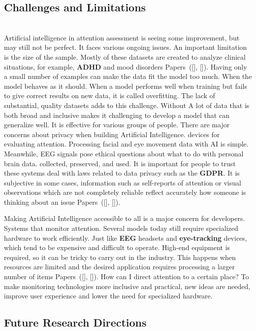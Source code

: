 \documentclass[twocolumn,12pt]{article}
\begin{document}
{\subsection{ Challenges and Limitations} \\ 

Artificial intelligence in attention assessment is seeing some improvement, but may still not be perfect. It faces various ongoing issues. An important limitation is the size of the sample. Mostly of these datasets are created to analyze clinical situations, for example, \textbf{ADHD} and mood disorders Papers~([\citealp{ref11}], [\citealp{ref13}]). Having only a small number of examples can make the data fit the model too much. When the model behaves as it should. When a model performs well when training but fails to give correct results on new data, it is called overfitting. The lack of substantial, quality datasets adds to this challenge. Without
A lot of data that is both broad and inclusive makes it challenging to develop a model that can generalize well. It is effective for various groups of people. There are major concerns about privacy when building Artificial Intelligence.
devices for evaluating attention. Processing facial and eye movement data with AI is simple. Meanwhile, EEG signals pose ethical questions about what to do with personal brain data.
collected, preserved, and used. It is important for people to trust these systems deal with laws related to data privacy such as the \textbf{GDPR}. It is subjective in some cases, information such as self-reports of attention or visual observations which are not completely reliable reflect accurately how someone is thinking about an issue Papers~([\citealp{ref5}], [\citealp{ref6}]).

Making Artificial Intelligence accessible to all is a major concern for developers. Systems that monitor attention. Several models today still require specialized hardware to work efficiently. Just like \textbf{EEG} headsets and \textbf{eye-tracking} devices, which tend to be expensive and difficult to operate. High-end equipment is required, so it can be tricky to carry out in the industry. This happens when resources are limited and the desired application requires processing a larger number of items Papers~([\citealp{ref8}], [\citealp{ref14}]). How can I direct attention to a certain place? To make monitoring technologies more inclusive and practical, new ideas are needed, improve user experience and lower the need for specialized hardware.

\subsection{ Future Research Directions} \\

}
\end{document}

